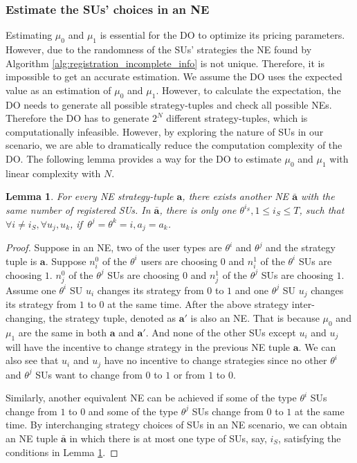 \documentclass[journal]{IEEEtran}
\newtheorem{lemma}[theorem]{Lemma}
\begin{document}
\subsubsection{Estimate the SUs' choices in an NE}

Estimating $\mu_0$ and $\mu_1$ is essential for the DO to optimize its pricing parameters. However, due to the randomness of the SUs' strategies the NE found by Algorithm \ref{alg:registration_incomplete_info} is not unique. Therefore, it is impossible to get an accurate estimation. We assume the DO uses the expected value as an estimation of $\mu_0$ and $\mu_1$. However, to calculate the expectation, the DO needs to generate all possible strategy-tuples and check all possible NEs. Therefore the DO has to generate $2^N$ different strategy-tuples, which is computationally infeasible. However, by exploring the nature of SUs in our scenario, we are able to dramatically reduce the computation complexity of the DO. The following lemma provides a way for the DO to estimate $\mu_0$ and $\mu_1$ with linear complexity with $N$.

\begin{lemma}
\label{lemma:NDRG_property_incomplete}
For every NE strategy-tuple $\mathbf{a}$, there exists another NE $\mathbf{\bar{a}}$ with the same number of registered SUs. In $\mathbf{\bar{a}}$, there is only one $\theta^{i_S}, 1\leq i_S\leq T$, such that $\forall i\neq i_S, \forall u_j, u_k$, if $\,\theta^j=\theta^k=i, a_j=a_k$.
\end{lemma}
\begin{proof}
Suppose in an NE, two of the user types are $\theta^i$ and $\theta^j$ and the strategy tuple is $\mathbf{a}$. Suppose $n_i^0$ of the $\theta^i$ users are choosing $0$ and $n_i^1$ of the $\theta^i$ SUs are choosing $1$. $n_j^0$ of the $\theta^j$ SUs are choosing $0$ and $n_j^1$ of the $\theta^j$ SUs are choosing $1$. Assume one $\theta^i$ SU $u_i$ changes its strategy from $0$ to $1$ and one $\theta^j$ SU $u_j$ changes its strategy from $1$ to $0$ at the same time. After the above strategy inter-changing, the strategy tuple, denoted as $\mathbf{a'}$ is also an NE. That is because $\mu_0$ and $\mu_1$ are the same in both $\mathbf{a}$ and $\mathbf{a'}$.
And none of the other SUs except $u_i$ and $u_j$ will have the incentive to change strategy in the previous NE tuple $\mathbf{a}$. We can also see that $u_i$ and $u_j$ have no incentive to change strategies since no other $\theta^i$ and $\theta^j$ SUs want to change from $0$ to $1$ or from $1$ to $0$.

Similarly, another equivalent NE can be achieved if some of the type $\theta^i$ SUs change from $1$ to $0$ and some of the type $\theta^j$ SUs change from $0$ to $1$ at the same time. By interchanging strategy choices of SUs in an NE scenario, we can obtain an NE tuple $\mathbf{\bar{a}}$ in which there is at most one type of SUs, say, $i_S$, satisfying the conditions in Lemma \ref{lemma:NDRG_property_incomplete}.
\end{proof}
\end{document}
